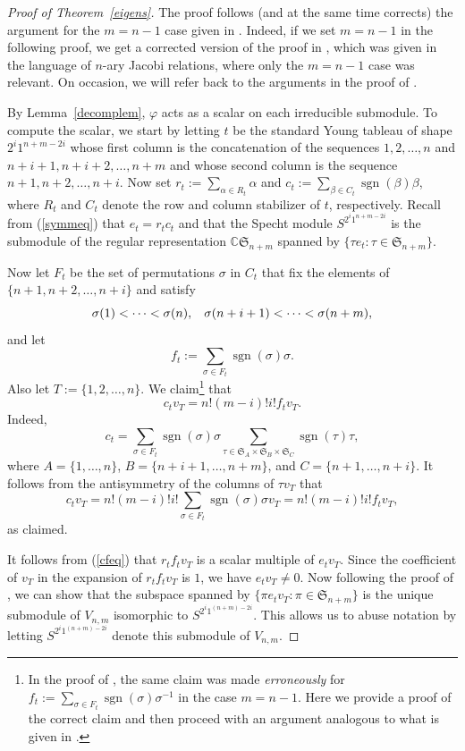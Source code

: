 \documentclass[12pt]{amsart}
\numberwithin{equation}{section}
\DeclareMathOperator{\sgn}{sgn}
\newcommand{\be}{\begin{equation}}
\newcommand{\ee}{\end{equation}}
\def\C{{\mathbb C}}
\def\sg{\mathfrak S}
\begin{document}
\begin{proof}[Proof of Theorem~\ref{eigens}] 
The proof   follows (and at the same time corrects) the argument for the  $m=n-1$ case given in \cite[Theorem 2.4]{FHSW2}.  Indeed, if we set $m=n-1$ in the following proof, we get  a corrected version of the proof in \cite{FHSW2}, which was given in the language of  $n$-ary Jacobi relations, where only the $m=n-1$ case was relevant.   
On occasion, we  will refer back to the arguments in the proof of \cite[Theorem 2.4]{FHSW2}.

By Lemma~\ref{decomplem}, $\varphi$ acts as a scalar on each irreducible submodule. 
 To compute the scalar, we start by letting $t$ be the standard Young tableau of shape $2^i1^{n+m-2i}$ whose first column is the concatenation of the sequences $1,2,\dots,n$ and $n+i+1,n+i+2, \dots, n+m$ and whose second column is the sequence $n+1, n+2, \dots, n+i$.  
Now set $r_t:= \sum_{\alpha \in R_t} \alpha$ and $c_t:= \sum_{\beta \in C_t}\sgn(\beta) \beta$, where  $R_t$ and $C_t$ denote the row and column stabilizer of $t$, respectively.  Recall from (\ref{symmeq}) that  $e_t = r_t c_t$  and that the Specht module $S^{2^i 1^{n+m-2i}}$ is the submodule of the regular representation  $\C \sg_{n+m}$ spanned by $\{\tau e_t : \tau \in \sg_{n+m} \} $.

Now let $F_t$ be the set of permutations $\sigma$ in $C_t$ that  fix the elements of  $\{ n+1, n+2, \dots , n+i\}$ and satisfy $$\sigma(1)<\cdots <\sigma(n), \hskip .3cm  \sigma(n+i+1)<\cdots <\sigma(n+m),$$  and let $$f_t:=\sum_{\sigma \in F_t} \sgn(\sigma) \sigma. $$
Also let $T :=\{1,2, \dots, n\}$.  We 
claim\footnote{In the proof of \cite[Theorem 2.4]{FHSW2}, the same claim was made {\em erroneously}   for $f_t:=\sum_{\sigma \in F_t} \sgn(\sigma) \sigma^{-1}$ in the case $m=n-1$. Here we provide a proof of the correct claim and then proceed with an argument analogous to what is given in   \cite{FHSW2}. } that  
\be \label{cfeq} c_t v_T= n!(m-i)! i! f_t v_T.\ee
Indeed, $$c_t = \sum_{\sigma \in F_t} \sgn(\sigma) \sigma  \sum_{\tau \in \sg_A \times \sg_B \times \sg_C } \sgn(\tau) \tau,$$
where  $A=\{1,\dots,n\}$, $B= \{n+i+1,\dots, n+m\}$, and $C=\{n+1,\dots,n+i\}$. It follows from the antisymmetry of the columns of $\tau v_T$ that 
$$c_t v_T = n!(m-i)! i!\sum_{\sigma \in F_t} \sgn(\sigma) \sigma v_T = n!(m-i)! i! f_t v_T,$$
as claimed.

It follows from (\ref{cfeq}) that   $r_t f_t v_T$  is a  scalar multiple of $e_t v_T$. 
Since the coefficient of $v_T$ in the expansion of $r_tf_t v_T$ is $1$, we have $e_tv_T \ne 0$.
Now following the proof of \cite[Theorem 2.4]{FHSW2}, we can show  that the subspace spanned by $\{\pi e_t v_T : \pi \in \sg_{n+m} \} $ is the unique submodule of $V_{n,m}$ isomorphic to $S^{2^i1^{(n+m)-2i}}$. 
This allows us to abuse notation by letting $S^{2^i1^{(n+m)-2i}}$ denote this submodule of $V_{n,m}$.


\end{proof}
\end{document}
